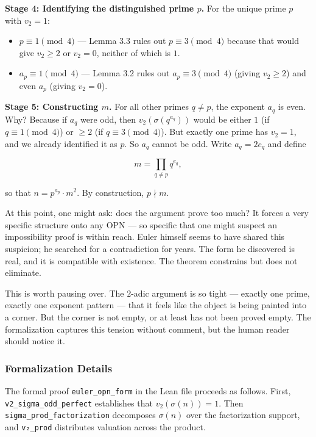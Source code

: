 \documentclass[11pt,a4paper]{article}
\begin{document}
\textbf{Stage 4: Identifying the distinguished prime $p$.} For the unique prime $p$ with $v_2 = 1$:

\begin{itemize}
    \item $p \equiv 1 \pmod{4}$ --- Lemma 3.3 rules out $p \equiv 3 \pmod{4}$ because that would give $v_2 \ge 2$ or $v_2 = 0$, neither of which is $1$.
    \item $a_p \equiv 1 \pmod{4}$ --- Lemma 3.2 rules out $a_p \equiv 3 \pmod{4}$ (giving $v_2 \ge 2$) and even $a_p$ (giving $v_2 = 0$).
\end{itemize}

\textbf{Stage 5: Constructing $m$.} For all other primes $q \neq p$, the exponent $a_q$ is even. Why? Because if $a_q$ were odd, then $v_2(\sigma(q^{a_q}))$ would be either $1$ (if $q \equiv 1 \pmod{4}$) or $\ge 2$ (if $q \equiv 3 \pmod{4}$). But exactly one prime has $v_2 = 1$, and we already identified it as $p$. So $a_q$ cannot be odd. Write $a_q = 2e_q$ and define

\[m = \prod_{q \neq p} q^{e_q},\]

so that $n = p^{a_p} \cdot m^2$. By construction, $p \nmid m$.

At this point, one might ask: does the argument prove too much? It forces a very specific structure onto any OPN --- so specific that one might suspect an impossibility proof is within reach. Euler himself seems to have shared this suspicion; he searched for a contradiction for years. The form he discovered is real, and it is compatible with existence. The theorem constrains but does not eliminate.

This is worth pausing over. The $2$-adic argument is so tight --- exactly one prime, exactly one exponent pattern --- that it feels like the object is being painted into a corner. But the corner is not empty, or at least has not been proved empty. The formalization captures this tension without comment, but the human reader should notice it.

\subsubsection{Formalization Details}

The formal proof \texttt{euler\_opn\_form} in the Lean file proceeds as follows. First, \texttt{v2\_sigma\_odd\_perfect} establishes that $v_2(\sigma(n)) = 1$. Then \texttt{sigma\_prod\_factorization} decomposes $\sigma(n)$ over the factorization support, and \texttt{v₂\_prod} distributes valuation across the product.
\end{document}
